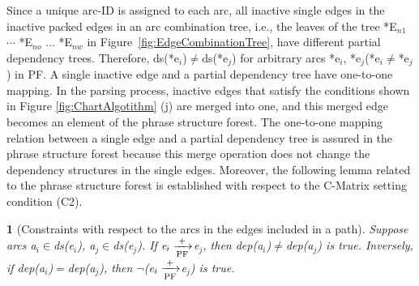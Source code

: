 \documentclass[english]{jnlp_1.4_rep}
\theoremstyle{break}
\theoremstyle{plain}
\newtheorem{lemma}{}[]
\newcommand{\proof}[1]{}
\theoremstyle{plain}
\begin{document}
Since a unique arc-ID is assigned to each arc, all inactive single
edges in the inactive packed edges in an arc combination tree, i.e.,
the leaves of the tree *E$_{n1}$ ${\cdots}$ *E$_{no}$ ${\ldots}$
*E$_{nw}$ in 
\linebreak
Figure~\ref{fig:EdgeCombinationTree}, have different partial
dependency trees. Therefore, ds(*e$_i$)${\neq}$ds(*e$_j$) for
arbitrary arcs *e$_i$, *e$_j$(*e$_i \neq$*e$_j$) in PF. A single
inactive edge and a partial dependency tree have one-to-one mapping.
In the parsing process, inactive edges that satisfy the conditions
shown in Figure \ref{fig:ChartAlgotithm} (j) are merged into one, and
this merged edge becomes an element of the phrase structure
forest. The one-to-one mapping relation between a single edge and a
partial dependency tree is assured in the phrase structure forest
because this merge operation does not change the dependency structures
in the single edges. Moreover, the following lemma related to the
phrase structure forest is established with respect to the C-Matrix
setting condition (C2).

\begin{lemma}[Constraints with respect to the arcs in the edges included in a path]
\label{lem:ArcConstraintOfArcsOnOnePath}
Suppose arcs a$_i \in$ds(e$_i$), a$_j\in$ds(e$_j$). If e$_i \xrightarrow[{\rm PF}]{+}$e$_j$, then dep(a$_i$)${\neq}$dep(a$_j$) is true. Inversely, if dep(a$_i$)$=$dep(a$_j$), then ${\neg}$(e$_i \xrightarrow[{\rm PF}]{+}$e$_j$) is true.

\proof{
This lemma is established because data structures in the single edges are trees whose top nodes are phrase heads, according to the partial dependency structure condition in \ref{sec:bunpoukisoku}.\\
}
\end{lemma}
\end{document}
